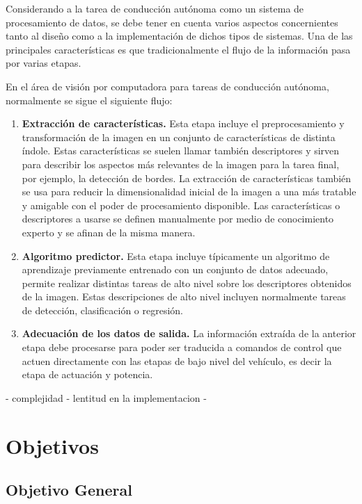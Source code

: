 \documentclass[12pt,letterpaper]{article}
\begin{document}
Considerando a la tarea de conducción autónoma como un sistema de procesamiento de datos, se debe tener en 
cuenta varios aspectos concernientes tanto al diseño como a la implementación de dichos tipos de sistemas. Una 
de las principales características es que tradicionalmente el flujo de la información pasa por varias etapas.

En el área de visión por computadora para tareas de conducción autónoma, normalmente se sigue el siguiente flujo:

\begin{enumerate}
    \item \textbf{Extracción de características.} Esta etapa incluye el preprocesamiento y transformación de la imagen 
    en un conjunto de características de distinta índole. Estas características se suelen llamar también descriptores 
    y sirven para describir los aspectos más relevantes de la imagen para la tarea final, por ejemplo, la detección de bordes. 
    La extracción de características también se usa para reducir la dimensionalidad inicial de la imagen a una más tratable y 
    amigable con el poder de procesamiento disponible. Las características o descriptores a usarse se definen manualmente por 
    medio de conocimiento experto y se afinan de la misma manera.

    \item \textbf{Algoritmo predictor.} Esta etapa incluye típicamente un algoritmo de aprendizaje previamente entrenado con un conjunto 
    de datos adecuado, permite realizar distintas tareas de alto nivel sobre los descriptores obtenidos de la imagen. Estas 
    descripciones de alto nivel incluyen normalmente tareas de detección, clasificación o regresión.

    \item \textbf{Adecuación de los datos de salida.} La información extraída de la anterior etapa debe procesarse para poder ser traducida 
    a comandos de control que actuen directamente con las etapas de bajo nivel del vehículo, es decir la etapa de actuación y potencia.
\end{enumerate}


  - complejidad
  - lentitud en la implementacion
  - 
\section{Objetivos}
\subsection{Objetivo General}
\end{document}
